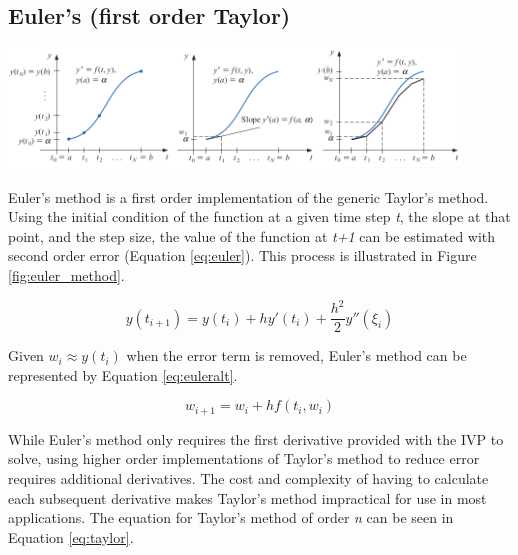 \documentclass{article}
\begin{document}
\subsection{Euler's (first order Taylor)}
\label{method:euler}

\begin{center}
  \includegraphics[width=0.9\textwidth]{../additional/euler_method.png}
  \label{fig:euler_method}
\end{center}

Euler's method is a first order implementation of the generic Taylor's method. Using the initial condition of the function at a given time step \textit{t}, the slope at that point, and the step size, the value of the function at \textit{t+1} can be estimated with second order error (Equation \ref{eq:euler}). This process is illustrated in Figure \ref{fig:euler_method}.

\begin{center}
	\begin{equation}
	y(t_{i+1}) = y(t_i) + hy'(t_i)+\frac{h^2}{2}y''(\xi_i) 
	\label{eq:euler}
	\end{equation}
\end{center}

Given $w_i \approx y(t_i)$ when the error term is removed, Euler's method can be represented by Equation \ref{eq:euleralt}.


\begin{center}
	\begin{equation}
	w_{i+1} = w_i + hf(t_i, w_i)
	\label{eq:euleralt}
	\end{equation}
\end{center}

While Euler's method only requires the first derivative provided with the IVP to solve, using higher order implementations of Taylor's method to reduce error requires additional derivatives. The cost and complexity of having to calculate each subsequent derivative makes Taylor's method impractical for use in most applications. The equation for Taylor's method of order \textit{n} can be seen in Equation \ref{eq:taylor}.
\end{document}
